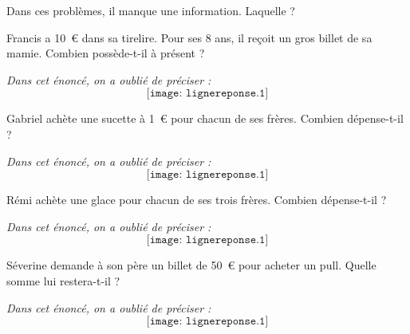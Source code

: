 \par Dans ces problèmes, il manque une information. Laquelle ?
\begin{myenumerate}
  \item Francis a 10~\textgreek{\euro} dans sa tirelire. Pour ses 8 ans, il reçoit un gros billet de sa mamie. Combien possède-t-il à présent ?
\par{\em Dans cet énoncé, on a oublié de préciser :}
\[\texttt{[image: lignereponse.1]}\]
\item Gabriel achète une sucette à 1~\textgreek{\euro} pour chacun de ses frères. Combien dépense-t-il ?
\par{\em Dans cet énoncé, on a oublié de préciser :}
\[\texttt{[image: lignereponse.1]}\]
\item Rémi achète une glace pour chacun de ses trois frères. Combien dépense-t-il ?
\par{\em Dans cet énoncé, on a oublié de préciser :}
\[\texttt{[image: lignereponse.1]}\]
\item Séverine demande à son père un billet de 50~\textgreek{\euro} pour acheter un pull. Quelle somme lui restera-t-il ?
\par{\em Dans cet énoncé, on a oublié de préciser :}
\[\texttt{[image: lignereponse.1]}\]
\end{myenumerate}